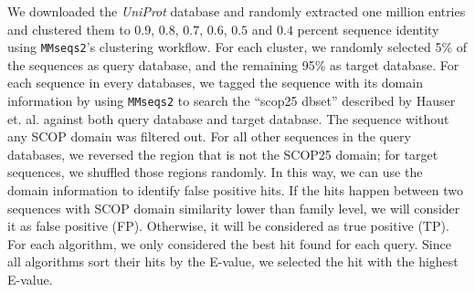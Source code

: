 We downloaded the \textit{UniProt} database and randomly extracted one million entries and clustered them to $0.9$, $0.8$, $0.7$, $0.6$, $0.5$ and $0.4$ percent sequence identity using \texttt{MMseqs2}'s clustering workflow.
For each cluster, we randomly selected 5\% of the sequences as query database, and the remaining 95\% as target database.
For each sequence in every databases, we tagged the sequence with its domain information by using \texttt{MMseqs2} to search the ``scop25 dbset'' described by Hauser et.
al.
\cite{hauser_mmseqs_2016} against both query database and target database.
The sequence without any SCOP domain was filtered out.
For all other sequences in the query databases, we reversed the region that is not the SCOP25 domain; for target sequences, we shuffled those regions randomly.
In this way, we can use the domain information to identify false positive hits.
If the hits happen between two sequences with SCOP domain similarity lower than family level, we will consider it as false positive (FP).
Otherwise, it will be considered as true positive (TP).
For each algorithm, we only considered the best hit found for each query.
Since all algorithms
sort their hits by the E-value, we selected the hit with the highest E-value.

